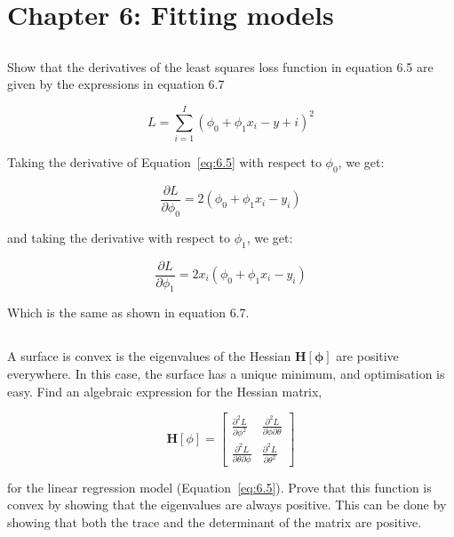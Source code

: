 \documentclass[12pt]{report}
\begin{document}
\section*{Chapter 6: Fitting models}

\subsection{}
\begin{mdframed}
    Show that the derivatives of the least squares loss function in equation 6.5 are given by the expressions in equation 6.7
\end{mdframed}

\begin{equation}
    L = \sum_{i=1}^{I} (\phi_{0} + \phi_{1}x_{i} - y+{i})^2
    \tag{6.5}
    \label{eq:6.5}
\end{equation}

Taking the derivative of Equation~\ref{eq:6.5} with respect to $\phi_{0}$, we get:

\begin{equation*}
    \frac{\partial L}{\partial \phi_{0}} =2(\phi_{0} + \phi_{1}x_{i} - y_{i})
\end{equation*}

and taking the derivative with respect to $\phi_{1}$, we get:

\begin{equation*}
    \frac{\partial L}{\partial \phi_{1}} = 2x_{i}(\phi_{0} + \phi_{1}x_{i} - y_{i})
\end{equation*}

Which is the same as shown in equation 6.7.

\subsection{}
\begin{mdframed}
    A surface is convex is the eigenvalues of the Hessian $\mathbf{H[\phi]}$ are positive everywhere. In this case, the surface has a unique minimum, and optimisation is easy. Find an algebraic expression for the Hessian matrix,

    \begin{equation*}
        \mathbf{H}[\phi] = \left[\begin{matrix}
                \frac{\partial^2 L}{\partial \phi^2}               & \frac{\partial^2 L}{\partial \phi \partial \theta} \\
                \frac{\partial^2 L}{\partial \theta \partial \phi} & \frac{\partial^2 L}{\partial \theta^2}
            \end{matrix}\right]
    \end{equation*}

    for the linear regression model (Equation~\ref{eq:6.5}). Prove that this function is convex by showing that the eigenvalues are always positive. This can be done by showing that both the trace and the determinant of the matrix are positive.
\end{mdframed}
\end{document}
